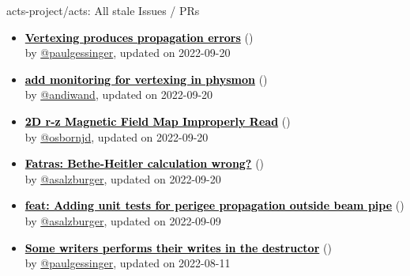\begin{frame}[allowframebreaks]{ acts-project/acts: All stale Issues / PRs}
\begin{itemize}
    \item\iss\prstale\textbf{\href{https://github.com/acts-project/acts/issues/1345}{\textcolor{black}{Vertexing produces propagation errors}}}
    (\href{https://github.com/acts-project/acts/issues/1345}{}) \\
    by \href{https://github.com/paulgessinger}{@paulgessinger}, updated on 2022-09-20

    \item\iss\prstale\textbf{\href{https://github.com/acts-project/acts/issues/1313}{\textcolor{black}{add monitoring for vertexing in physmon}}}
    (\href{https://github.com/acts-project/acts/issues/1313}{}) \\
    by \href{https://github.com/andiwand}{@andiwand}, updated on 2022-09-20

    \item\iss\prstale\textbf{\href{https://github.com/acts-project/acts/issues/669}{\textcolor{black}{2D r-z Magnetic Field Map Improperly Read}}}
    (\href{https://github.com/acts-project/acts/issues/669}{}) \\
    by \href{https://github.com/osbornjd}{@osbornjd}, updated on 2022-09-20

    \item\iss\prstale\textbf{\href{https://github.com/acts-project/acts/issues/1437}{\textcolor{black}{Fatras: Bethe-Heitler calculation wrong?}}}
    (\href{https://github.com/acts-project/acts/issues/1437}{}) \\
    by \href{https://github.com/asalzburger}{@asalzburger}, updated on 2022-09-20

    \item\propen\prwip\prstale\textbf{\href{https://github.com/acts-project/acts/pull/1354}{\textcolor{black}{feat: Adding unit tests for perigee propagation outside beam pipe}}}
    (\href{https://github.com/acts-project/acts/pull/1354}{}) \\
    by \href{https://github.com/asalzburger}{@asalzburger}, updated on 2022-09-09

    \item\iss\prstale\textbf{\href{https://github.com/acts-project/acts/issues/881}{\textcolor{black}{Some writers performs their writes in the destructor}}}
    (\href{https://github.com/acts-project/acts/issues/881}{}) \\
    by \href{https://github.com/paulgessinger}{@paulgessinger}, updated on 2022-08-11


\end{itemize}
\end{frame}
